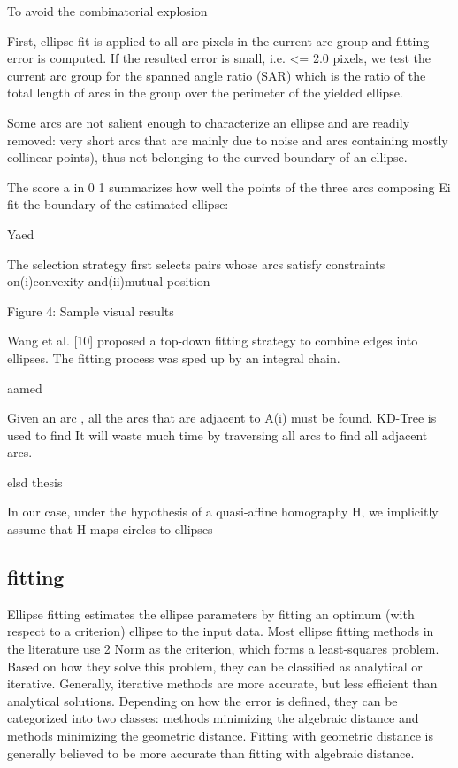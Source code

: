 \documentclass[a4paper]{report}
\begin{document}
To avoid the combinatorial explosion


First, ellipse fit is applied to all arc pixels in the current arc group and fitting error is computed. 
If the resulted error is small, i.e. <= 2.0 pixels, we test the current arc group for the spanned angle ratio
(SAR) which is the ratio of the total length of arcs in the group over the perimeter of the yielded ellipse.


Some arcs are not salient enough to characterize an ellipse
and are readily removed: very short arcs that are
mainly due to noise and arcs containing mostly collinear points), thus not belonging to the curved
boundary of an ellipse.


The score a in 0 1
summarizes how well the points of the three arcs composing Ei fit the boundary of the estimated ellipse:


Yaed

The selection strategy first selects pairs whose arcs satisfy constraints on(i)convexity and(ii)mutual position

Figure 4: Sample visual results


Wang et al. [10] proposed a top-down fitting strategy to combine edges into
ellipses. The fitting process was sped up by an integral
chain.

aamed



Given an arc , all the arcs that are adjacent to A(i) must be found. KD-Tree is used to find
It will waste much
time by traversing all arcs to find all adjacent arcs.

elsd thesis


In our case, under the hypothesis of a
quasi-affine homography H, we implicitly assume that H maps circles to ellipses




\subsection{fitting}
Ellipse fitting estimates the ellipse parameters by fitting an optimum (with respect to a criterion) ellipse to the input data.
Most ellipse fitting methods in the literature use 2 Norm as the criterion, which forms a least-squares problem.
Based on how they solve this problem, they can be classified as analytical or iterative. Generally, iterative methods are more accurate, but less efficient than analytical solutions.
Depending on how the error is defined, they can be categorized into two classes: methods minimizing the algebraic distance and methods minimizing the geometric distance. Fitting with geometric distance is generally believed to be more accurate than fitting with algebraic distance.
\end{document}
